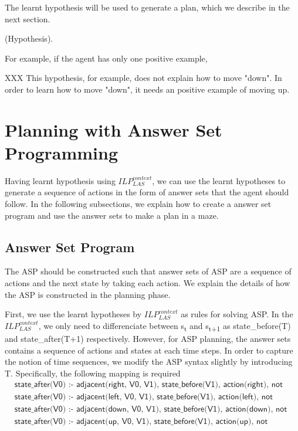 The learnt hypothesis will be used to generate a plan, which we describe in the next section.

\begin{examp} \normalfont (Hypothesis).

For example, if the agent has only one positive example,

XXX
This hypothesis, for example, does not explain how to move "down". In order to learn how to move "down", it needs an positive example of moving up.
\end{examp}

\section{Planning with Answer Set Programming}
\label{sec:planning}

Having learnt hypothesis using $ILP_{LAS}^{context}$, we can use the learnt hypotheses to generate a sequence of actions in the form of answer sets that the agent should follow.
In the following subsections, we explain how to create a answer set program and use the answer sets to make a plan in a maze.
\subsection{Answer Set Program}
\label{subsec:answer_set_program}
The ASP should be constructed such that answer sets of ASP are a sequence of actions and the next state by taking each action. 
We explain the details of how the ASP is constructed in the planning phase.

First, we use the learnt hypotheses by $ILP_{LAS}^{context}$ as rules for solving ASP.
In the  $ILP_{LAS}^{context}$, we only need to differenciate between s\textsubscript{t} and s\textsubscript{t+1} as \textsf{state\_before(T)} and \textsf{state\_after(T+1)} respectively.
However, for ASP planning, the answer sets contains a sequence of actions and states at each time steps. In order to capture the notion of time sequences, we modify the ASP syntax slightly by 
introducing T. Specifically, the following mapping is required 
\begin{equation}
\begin{split}
&\textsf{state\_after(V0) :- adjacent(right, V0, V1), state\_before(V1), action(right), not wall(V0).}\\
&\textsf{state\_after(V0) :- adjacent(left, V0, V1), state\_before(V1), action(left), not wall(V0).}\\
&\textsf{state\_after(V0) :- adjacent(down, V0, V1), state\_before(V1), action(down), not wall(V0).}\\
&\textsf{state\_after(V0) :- adjacent(up, V0, V1), state\_before(V1), action(up), not wall(V0).}
\end{split}
\end{equation}

